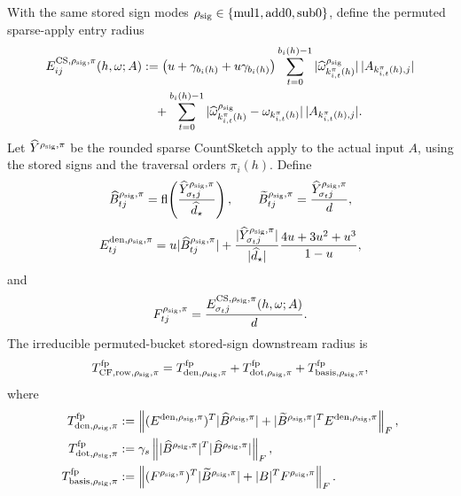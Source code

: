 \documentclass[11pt]{article}
\newcommand{\Frob}[1]{\left\lVert #1\right\rVert_F}
\newcommand{\fl}{\operatorname{fl}}
\theoremstyle{remark}
\begin{document}
With the same stored sign modes
\(\rho_{\rm sig}\in\{\mathrm{mul1},\mathrm{add0},\mathrm{sub0}\}\), define
the permuted sparse-apply entry radius
\[
\begin{aligned}
  E^{{\rm CS},\rho_{\rm sig},\pi}_{ij}(h,\omega;A)
  &:=
  \bigl(u+\gamma_{b_i(h)}+u\gamma_{b_i(h)}\bigr)
  \sum_{t=0}^{b_i(h)-1}
    |\widehat\omega_{k_{i,t}^{\pi}(h)}^{\rho_{\rm sig}}|\,
    |A_{k_{i,t}^{\pi}(h),j}|\\
  &\quad+
  \sum_{t=0}^{b_i(h)-1}
    |\widehat\omega_{k_{i,t}^{\pi}(h)}^{\rho_{\rm sig}}
      -\omega_{k_{i,t}^{\pi}(h)}|\,
    |A_{k_{i,t}^{\pi}(h),j}| .
\end{aligned}
\]
Let \(\widehat Y^{\rho_{\rm sig},\pi}\) be the rounded sparse CountSketch
apply to the actual input \(A\), using the stored signs and the traversal
orders \(\pi_i(h)\).  Define
\[
  \widehat B^{\rho_{\rm sig},\pi}_{tj}
  =
  \fl\!\left(
    \frac{\widehat Y^{\rho_{\rm sig},\pi}_{\sigma_tj}}
         {\widehat d_\star}\right),
  \qquad
  \widetilde B^{\rho_{\rm sig},\pi}_{tj}
  =
  \frac{\widehat Y^{\rho_{\rm sig},\pi}_{\sigma_tj}}{d},
\]
\[
  E^{{\rm den},\rho_{\rm sig},\pi}_{tj}
  =
  u|\widehat B^{\rho_{\rm sig},\pi}_{tj}|
  +
  \frac{|\widehat Y^{\rho_{\rm sig},\pi}_{\sigma_tj}|}
       {|\widehat d_\star|}
  \frac{4u+3u^2+u^3}{1-u},
\]
and
\[
  F^{\rho_{\rm sig},\pi}_{tj}
  =
  \frac{E^{{\rm CS},\rho_{\rm sig},\pi}_{\sigma_tj}
        (h,\omega;A)}{d}.
\]
The irreducible permuted-bucket stored-sign downstream radius is
\[
  T_{{\rm CF,row},\rho_{\rm sig},\pi}^{\rm fp}
  =
  T_{{\rm den},\rho_{\rm sig},\pi}^{\rm fp}
  +
  T_{{\rm dot},\rho_{\rm sig},\pi}^{\rm fp}
  +
  T_{{\rm basis},\rho_{\rm sig},\pi}^{\rm fp},
\]
where
\[
\begin{aligned}
  T_{{\rm den},\rho_{\rm sig},\pi}^{\rm fp}
  &:=
  \Frob{
    (E^{{\rm den},\rho_{\rm sig},\pi})^T
    |\widehat B^{\rho_{\rm sig},\pi}|
    +
    |\widetilde B^{\rho_{\rm sig},\pi}|^T
    E^{{\rm den},\rho_{\rm sig},\pi}},\\
  T_{{\rm dot},\rho_{\rm sig},\pi}^{\rm fp}
  &:=
  \gamma_s
  \Frob{
    |\widehat B^{\rho_{\rm sig},\pi}|^T
    |\widehat B^{\rho_{\rm sig},\pi}|},\\
  T_{{\rm basis},\rho_{\rm sig},\pi}^{\rm fp}
  &:=
  \Frob{
    (F^{\rho_{\rm sig},\pi})^T
    |\widetilde B^{\rho_{\rm sig},\pi}|
    +
    |B|^TF^{\rho_{\rm sig},\pi}} .
\end{aligned}
\]
\end{document}
